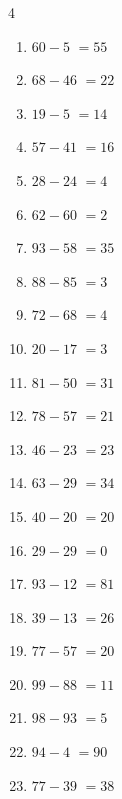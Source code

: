 \begin{multicols}{4}
\begin{enumerate}
  \item $60-5$
        $=55$

  \item $68-46$
        $=22$

  \item $19-5$
        $=14$

  \item $57-41$
        $=16$

  \item $28-24$
        $=4$

  \item $62-60$
        $=2$

  \item $93-58$
        $=35$

  \item $88-85$
        $=3$

  \item $72-68$
        $=4$

  \item $20-17$
        $=3$

  \item $81-50$
        $=31$

  \item $78-57$
        $=21$

  \item $46-23$
        $=23$

  \item $63-29$
        $=34$

  \item $40-20$
        $=20$

  \item $29-29$
        $=0$

  \item $93-12$
        $=81$

  \item $39-13$
        $=26$

  \item $77-57$
        $=20$

  \item $99-88$
        $=11$

  \item $98-93$
        $=5$

\columnbreak %

  \item $94-4$
        $=90$

  \item $77-39$
        $=38$


\end{enumerate}
\end{multicols}
